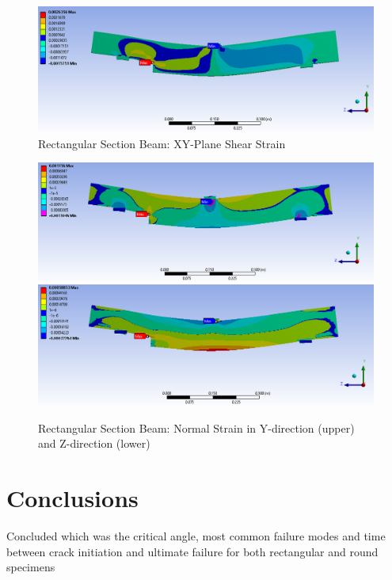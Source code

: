 \documentclass[11pt,a4paper]{article}
\numberwithin{equation}{subsection}
\begin{document}
\begin{figure}[h]
	\begin{center}
		\includegraphics[scale=0.45]{YZ_shear_strain}
	\end{center}
	\caption{Rectangular Section Beam: XY-Plane Shear Strain}
	\label{fig:yz_shear}
\end{figure}

\begin{figure}[h]
	\begin{center}
		\includegraphics[scale=0.45]{y_normal_strain}
		\includegraphics[scale=0.45]{z_normal_strain}
	\end{center}
	\caption{Rectangular Section Beam: Normal Strain in Y-direction (upper) and Z-direction (lower)}
	\label{fig:fig:y_norm}
\end{figure}
\pagebreak

\section{Conclusions}
\vspace*{\baselineskip}
\noindent Concluded which was the critical angle, most common failure modes and time between crack initiation and ultimate failure for both rectangular and round specimens\par
\end{document}
